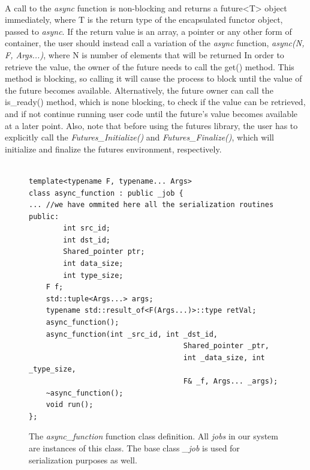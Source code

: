\paragraph{}
A call to the \emph{async} function is non-blocking and returns a future<T> object immediately, 
where T is the return type of the encapsulated functor object, passed to \emph{async}.
 If the return value is an array, a pointer or any other form of container, the user
should instead call a variation of the \emph{async} function, \emph{async(N, F, Args...)}, 
where N is number of elements that will be returned 
In order to retrieve the value,
the owner of the future needs to call the get() method.  This method is blocking, so calling it will cause the 
process to block until the value of the future becomes available.  Alternatively, the future owner can call the
is\_ready() method, which is none blocking, to check if the value can be retrieved, and if not continue running
user code until the future's value becomes available at a later point.  Also, note that before using
the futures library, the user has to explicitly call the \emph{Futures\_Initialize()} and \emph{Futures\_Finalize()},
which will initialize and finalize the futures environment, respectively. 
    
\begin{figure}[!ht]
\begin{lstlisting}

template<typename F, typename... Args>
class async_function : public _job {
... //we have ommited here all the serialization routines
public:
		int src_id;
		int dst_id;
		Shared_pointer ptr;
		int data_size;
		int type_size;
    F f;
  	std::tuple<Args...> args;
    typename std::result_of<F(Args...)>::type retVal;
    async_function();
    async_function(int _src_id, int _dst_id, 
									Shared_pointer _ptr, 
									int _data_size, int _type_size,
									F& _f, Args... _args);
    ~async_function();
    void run();
};
\end{lstlisting}
\caption{The \emph{async\_function} function class definition.  All \emph{jobs} in our system are
instances of this class.  The base class \emph{\_job} is used for serialization purposes as well.}
\label{lst:async_function}
\end{figure}

